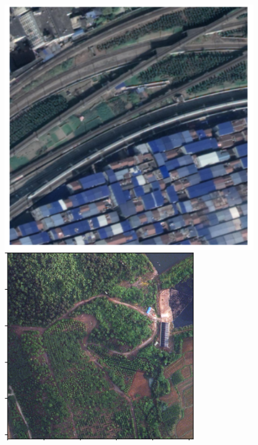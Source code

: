 \documentclass{article}
\begin{document}
\begin{multicols}{2}
\begin{figure}[H]
	\centering
	\begin{minipage}{0.48\linewidth}
		\centering
		\includegraphics[width=1\linewidth]{image/urban_2.png}

	\end{minipage}
	\begin{minipage}{0.48\linewidth}
		\centering
		\includegraphics[width=1\linewidth]{image/rural_2.png}


\end{minipage}
\end{figure}
\end{multicols}
\end{document}
